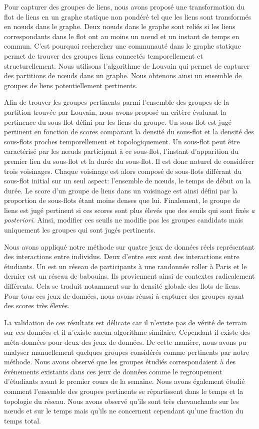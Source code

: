 Pour capturer des groupes de liens, nous avons proposé une transformation du flot de liens en un graphe statique non pondéré tel que les liens sont transformés en n\oe{}uds dans le graphe.
Deux n\oe{}uds dans le graphe sont reliés si les liens correspondants dans le flot ont au moins un n\oe{}ud et un instant de temps en commun.
C'est pourquoi rechercher une communauté dans le graphe statique permet de trouver des groupes liens connectés temporellement et structurellement.
Nous utilisons l'algorithme de Louvain qui permet de capturer des partitions de n\oe{}uds dans un graphe.
Nous obtenons ainsi un ensemble de groupes de liens potentiellement pertinents.

Afin de trouver les groupes pertinents parmi l'ensemble des groupes de la partition trouvée par Louvain, nous avons proposé un critère évaluant la pertinence du sous-flot défini par les liens du groupe.
Un sous-flot est jugé pertinent en fonction de scores comparant la densité du sous-flot et la densité des sous-flots proches temporellement et topologiquement.
Un sous-flot peut être caractérisé par les n\oe{}uds participant à ce sous-flot, l'instant d'apparition du premier lien du sous-flot et la durée du sous-flot.
Il est donc naturel de considérer trois voisinages.
Chaque voisinage est alors composé de sous-flots différant du sous-flot initial sur un seul aspect: l'ensemble de n\oe{}uds, le temps de début ou la durée.
Le score d'un groupe de liens dans un voisinage est ainsi défini par la proportion de sous-flots étant moins denses que lui.
Finalement, le groupe de liens est jugé pertinent si ces scores sont plus élevés que des seuils qui sont fixés \emph{a posteriori}.
Ainsi, modifier ces seuils ne modifie pas les groupes candidats mais uniquement les groupes qui sont jugés pertinents.


Nous avons appliqué notre méthode sur quatre jeux de données réels représentant des interactions entre individus.
Deux d'entre eux sont des interactions entre étudiants.
Un est un réseau de participants à une randonnée roller à Paris et le dernier est un réseau de babouins.
Ils proviennent ainsi de contextes radicalement différents.
Cela se traduit notamment sur la densité globale des flots de liens.
Pour tous ces jeux de données, nous avons réussi à capturer des groupes ayant des scores très élevés.

La validation de ces résultats est délicate car il n'existe pas de vérité de terrain sur ces données et il n'existe aucun algorithme similaire.
Cependant il existe des méta-données pour deux des jeux de données.
De cette manière, nous avons pu analyser manuellement quelques groupes considérés comme pertinents par notre méthode.
Nous avons observé que les groupes étudiés correspondaient à des événements existants dans ces jeux de données comme le regroupement d'étudiants avant le premier cours de la semaine.
Nous avons également étudié comment l'ensemble des groupes pertinents se répartissent dans le temps et la topologie du réseau.
Nous avons observé qu'ils sont très chevauchants sur les n\oe{}uds et sur le temps mais qu'ils ne concernent cependant qu'une fraction du temps total.


